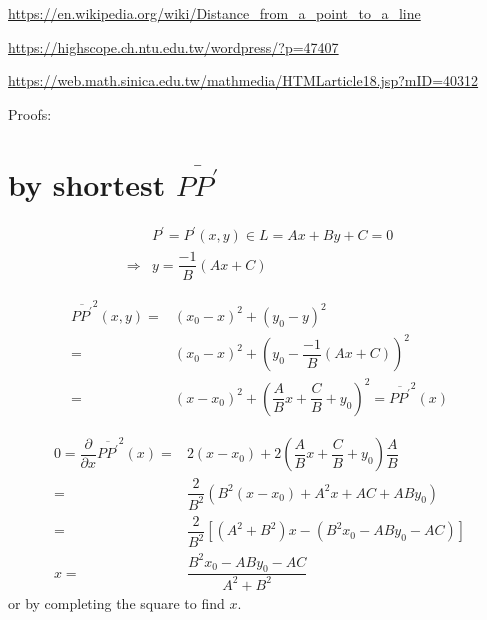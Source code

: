 \documentclass[
]{book}
\theoremstyle{definition}
\theoremstyle{definition}
\theoremstyle{definition}
\theoremstyle{definition}
\theoremstyle{remark}
\begin{document}
\url{https://en.wikipedia.org/wiki/Distance_from_a_point_to_a_line}

\url{https://highscope.ch.ntu.edu.tw/wordpress/?p=47407}

\url{https://web.math.sinica.edu.tw/mathmedia/HTMLarticle18.jsp?mID=40312}

Proofs:

\section{\texorpdfstring{by shortest \(\overline{PP^{\prime}}\)}{by shortest \textbackslash overline\{PP\^{}\{\textbackslash prime\}\}}}\label{by-shortest-overlineppprime}

\[
\begin{aligned}
 & P^{\prime}=P^{\prime}\left(x,y\right)\in L=Ax+By+C=0\\
\Rightarrow & y=\dfrac{-1}{B}\left(Ax+C\right)
\end{aligned}
\]

\[
\begin{aligned}
\overline{PP^{\prime}}^{2}\left(x,y\right)= & \left(x_{0}-x\right)^{2}+\left(y_{0}-y\right)^{2}\\
= & \left(x_{0}-x\right)^{2}+\left(y_{0}-\dfrac{-1}{B}\left(Ax+C\right)\right)^{2}\\
= & \left(x-x_{0}\right)^{2}+\left(\dfrac{A}{B}x+\dfrac{C}{B}+y_{0}\right)^{2}=\overline{PP^{\prime}}^{2}\left(x\right)
\end{aligned}
\]

\[
\begin{aligned}
0=\dfrac{\partial}{\partial x}\overline{PP^{\prime}}^{2}\left(x\right)= & 2\left(x-x_{0}\right)+2\left(\dfrac{A}{B}x+\dfrac{C}{B}+y_{0}\right)\dfrac{A}{B}\\
= & \dfrac{2}{B^{2}}\left(B^{2}\left(x-x_{0}\right)+A^{2}x+AC+ABy_{0}\right)\\
= & \dfrac{2}{B^{2}}\left[\left(A^{2}+B^{2}\right)x-\left(B^{2}x_{0}-ABy_{0}-AC\right)\right]\\
x= & \dfrac{B^{2}x_{0}-ABy_{0}-AC}{A^{2}+B^{2}}
\end{aligned}
\]
or by completing the square to find \(x\).
\end{document}
